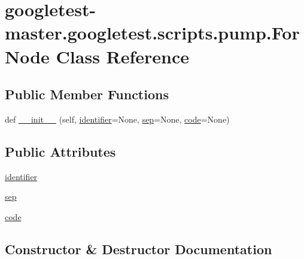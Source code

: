 \hypertarget{classgoogletest-master_1_1googletest_1_1scripts_1_1pump_1_1_for_node}{}\section{googletest-\/master.googletest.\+scripts.\+pump.\+For\+Node Class Reference}
\label{classgoogletest-master_1_1googletest_1_1scripts_1_1pump_1_1_for_node}
\subsection*{Public Member Functions}
\begin{DoxyCompactItemize}
\item 
def \mbox{\hyperlink{classgoogletest-master_1_1googletest_1_1scripts_1_1pump_1_1_for_node_a90409a33a093ecd8eaddde2084291478}{\+\_\+\+\_\+init\+\_\+\+\_\+}} (self, \mbox{\hyperlink{classgoogletest-master_1_1googletest_1_1scripts_1_1pump_1_1_for_node_a97a960747305588d8ccabd67feb0e0a2}{identifier}}=None, \mbox{\hyperlink{classgoogletest-master_1_1googletest_1_1scripts_1_1pump_1_1_for_node_ad2d499953efa5aaafeb6606549e18abb}{sep}}=None, \mbox{\hyperlink{classgoogletest-master_1_1googletest_1_1scripts_1_1pump_1_1_for_node_a192d26b6b0a29327f54d7c2c8c9dce7e}{code}}=None)
\end{DoxyCompactItemize}
\subsection*{Public Attributes}
\begin{DoxyCompactItemize}
\item 
\mbox{\hyperlink{classgoogletest-master_1_1googletest_1_1scripts_1_1pump_1_1_for_node_a97a960747305588d8ccabd67feb0e0a2}{identifier}}
\item 
\mbox{\hyperlink{classgoogletest-master_1_1googletest_1_1scripts_1_1pump_1_1_for_node_ad2d499953efa5aaafeb6606549e18abb}{sep}}
\item 
\mbox{\hyperlink{classgoogletest-master_1_1googletest_1_1scripts_1_1pump_1_1_for_node_a192d26b6b0a29327f54d7c2c8c9dce7e}{code}}
\end{DoxyCompactItemize}


\subsection{Constructor \& Destructor Documentation}
\mbox{\label{classgoogletest-master_1_1googletest_1_1scripts_1_1pump_1_1_for_node_a90409a33a093ecd8eaddde2084291478}} 
